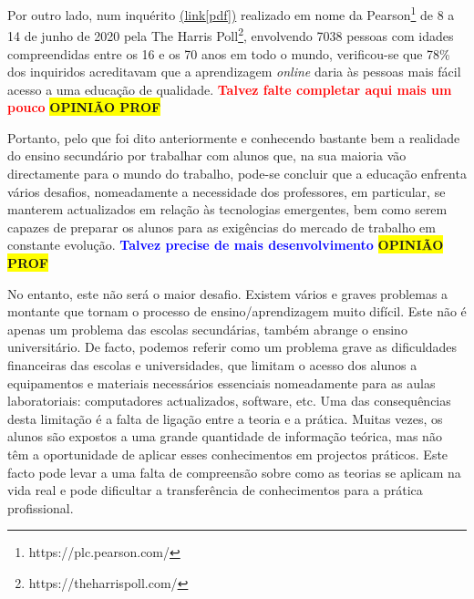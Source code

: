Por outro lado, num inquérito \href{https://plc.pearson.com/sites/pearson-corp/files/footer-image/pearson-global-learners-survey-2020.pdf}{(link[pdf])} realizado em nome da Pearson\footnote{https://plc.pearson.com/} de 8 a 14 de junho de 2020 pela The Harris Poll\footnote{https://theharrispoll.com/}, envolvendo 7038 pessoas com idades compreendidas entre os 16 e os 70 anos em todo o mundo, verificou-se que 78\% dos inquiridos acreditavam que a aprendizagem \textit{online} daria às pessoas mais fácil acesso a uma educação de qualidade. \textbf{\textcolor{red}{Talvez falte completar aqui mais um pouco}} \colorbox{yellow}{\textbf{OPINIÃO PROF}}

Portanto, pelo que foi dito anteriormente e conhecendo bastante bem a realidade do ensino secundário por trabalhar com alunos que, na sua maioria vão directamente para o mundo do trabalho, pode-se concluir que a educação enfrenta vários desafios, nomeadamente a necessidade dos professores, em particular, se manterem actualizados em relação às tecnologias emergentes, bem como serem capazes de preparar os alunos para as exigências do mercado de trabalho em constante evolução.
\textcolor{blue}{\textbf{Talvez precise de mais desenvolvimento}} \colorbox{yellow}{\textbf{OPINIÃO PROF}}

No entanto, este não será o maior desafio. Existem vários e graves problemas a montante que tornam o processo de ensino/aprendizagem muito difícil. Este não é apenas um problema das escolas secundárias, também abrange o ensino universitário. De facto, podemos referir como um problema grave as dificuldades financeiras\cite{dificuldadesfinanciamento} \cite{Financiamentoprofissional} \cite{Educacaofinanciamento} das escolas e universidades, que limitam o acesso dos alunos a equipamentos e materiais necessários essenciais nomeadamente para as aulas laboratoriais: computadores actualizados, software, etc. Uma das consequências desta limitação é a falta de ligação entre a teoria e a prática. Muitas vezes, os alunos são expostos a uma grande quantidade de informação teórica, mas não têm a oportunidade de aplicar esses conhecimentos em projectos práticos. Este facto pode levar a uma falta de compreensão sobre como as teorias se aplicam na vida real e pode dificultar a transferência de conhecimentos para a prática profissional.




